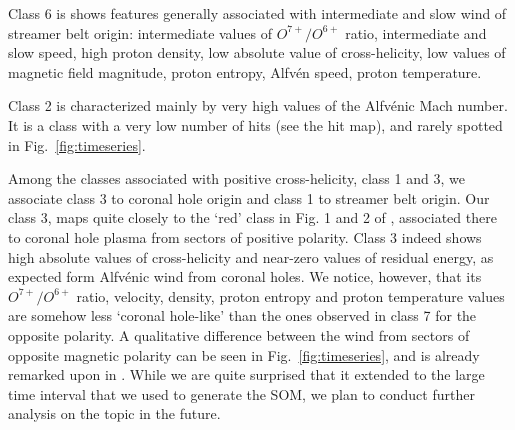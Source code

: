 \documentclass[utf8]{frontiersSCNS} %
\begin{document}
Class 6 is shows features generally associated with intermediate and slow wind of streamer belt origin: intermediate values of $O^{7+}/O^{6+}$ ratio, intermediate and slow speed, high proton density, low absolute value of cross-helicity, low values of magnetic field magnitude, proton entropy, Alfv\'{e}n speed, proton temperature.

Class 2 is characterized mainly by very high values of the Alfv\'enic Mach number. It is a class with a very low number of hits (see the hit map), and rarely spotted in Fig.~\ref{fig:timeseries}.

Among the classes associated with positive cross-helicity, class 1 and 3, we associate class 3 to coronal hole origin and class 1 to streamer belt origin. Our class 3, maps quite closely to the `red' class in Fig. 1 and 2 of \citep{Roberts2020}, associated there to coronal hole plasma from sectors of positive polarity. Class 3 indeed shows high absolute values of cross-helicity and near-zero values of residual energy, as expected form Alfv\'enic wind from coronal holes. We notice, however, that its $O^{7+}/O^{6+}$ ratio, velocity, density, proton entropy and proton temperature values are somehow less `coronal hole-like' than the ones observed in class 7 for the opposite polarity. A qualitative difference between the wind from sectors of opposite magnetic polarity can be seen in Fig.~\ref{fig:timeseries}, and is already remarked upon in \citep{Roberts2020}. While we are quite surprised that it extended to the large time interval that we used to generate the SOM, we plan to conduct further analysis on the topic in the future.
\end{document}
